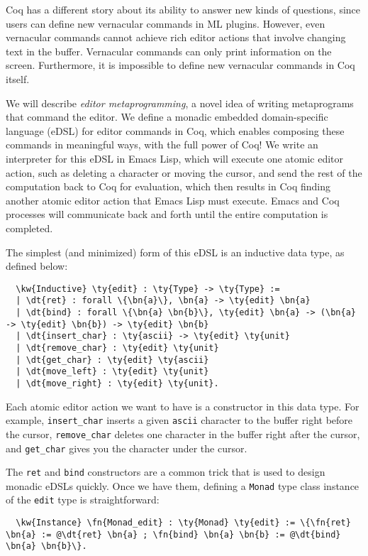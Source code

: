 \documentclass[acmlarge]{acmart}
\newcommand\fakeslant[1]{%
  \special{pdf: literal 1 0 0.167 1 0 0 cm}#1\special{pdf: literal 1 0 -0.167 1 0 0 cm}}
\newcommand{\IdrisData}[1]{\textcolor{IdrisRed}{#1}}
\newcommand{\IdrisType}[1]{\textcolor{IdrisBlue}{#1}}
\newcommand{\IdrisBound}[1]{\textcolor{IdrisLilac}{\fakeslant{#1}}}
\newcommand{\IdrisFunction}[1]{\textcolor{IdrisGreen}{#1}}
\newcommand{\IdrisKeyword}[1]{{\textbf{#1}}}
\newcommand{\ty}[1]{\IdrisType{\texttt{#1}}}
\newcommand{\kw}[1]{\IdrisKeyword{\texttt{#1}}}
\newcommand{\fn}[1]{\IdrisFunction{\texttt{#1}}}
\newcommand{\dt}[1]{\IdrisData{\texttt{#1}}}
\newcommand{\bn}[1]{\IdrisBound{\texttt{#1}}}
\begin{document}
  Coq has a different story about its ability to answer new kinds of questions,
  since users can define new vernacular commands in ML plugins.
  However, even vernacular commands cannot achieve rich editor actions that
  involve changing text in the buffer.
  Vernacular commands can only print information on the screen.
  Furthermore, it is impossible to define new vernacular commands in
  Coq itself.

  We will describe \emph{editor metaprogramming}, a
  novel idea of writing metaprograms that command the editor.
  We define a monadic embedded domain-specific language (eDSL) for editor
  commands in Coq, which enables composing these commands in meaningful ways,
  with the full power of Coq!
  We write an interpreter for this eDSL in Emacs Lisp, which will execute one
  atomic editor action, such as deleting a character or moving the cursor,  and
  send the rest of the computation back to Coq for evaluation, which then
  results in Coq finding another atomic editor action that Emacs Lisp must
  execute. Emacs and Coq processes will communicate back and forth until the
  entire computation is completed.

  The simplest (and minimized) form of this eDSL is an inductive data type, as defined below:

\begin{Verbatim}
  \kw{Inductive} \ty{edit} : \ty{Type} -> \ty{Type} :=
  | \dt{ret} : forall \{\bn{a}\}, \bn{a} -> \ty{edit} \bn{a}
  | \dt{bind} : forall \{\bn{a} \bn{b}\}, \ty{edit} \bn{a} -> (\bn{a} -> \ty{edit} \bn{b}) -> \ty{edit} \bn{b}
  | \dt{insert_char} : \ty{ascii} -> \ty{edit} \ty{unit}
  | \dt{remove_char} : \ty{edit} \ty{unit}
  | \dt{get_char} : \ty{edit} \ty{ascii}
  | \dt{move_left} : \ty{edit} \ty{unit}
  | \dt{move_right} : \ty{edit} \ty{unit}.
\end{Verbatim}

Each atomic editor action we want to have is a constructor in this data type. For example, \dt{insert\_char} inserts a given \ty{ascii} character to the buffer right before the cursor, \dt{remove\_char} deletes one character in the buffer right after the cursor, and \dt{get\_char} gives you the character under the cursor.

The \dt{ret} and \dt{bind} constructors are a common trick that is used to design monadic eDSLs quickly. Once we have them, defining a \ty{Monad} type class instance of the \ty{edit} type is straightforward:

\begin{Verbatim}
  \kw{Instance} \fn{Monad_edit} : \ty{Monad} \ty{edit} := \{\fn{ret} \bn{a} := @\dt{ret} \bn{a} ; \fn{bind} \bn{a} \bn{b} := @\dt{bind} \bn{a} \bn{b}\}.
\end{Verbatim}
\end{document}
